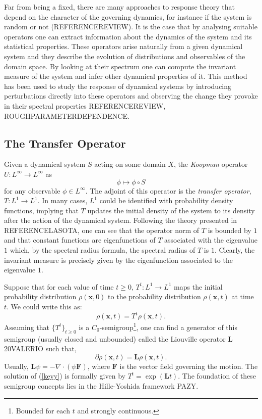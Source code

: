 Far from being a fixed, there are many approaches to response theory that depend on the character of the governing dynamics, for instance if the system is random or not (REFERENCEREVIEW). It is the case that by analysing suitable operators one can extract information about the dynamics of the system and its statistical properties. These operators arise naturally from a given dynamical system and they describe the evolution of distributions and observables of the domain space. By looking at their spectrum one can compute the invariant measure of the system and infer other dynamical properties of it. This method has been used to study the response of dynamical systems by introducing perturbations directly into these operators and observing the change they provoke in their spectral properties REFERENCEREVIEW, ROUGHPARAMETERDEPENDENCE.

\subsection*{The Transfer Operator}

Given a dynamical system $S$ acting on some domain $X$, the \emph{Koopman} operator $U:L^{\infty}\longrightarrow L^{\infty}$ as
\begin{equation}
	\phi \mapsto \phi \circ S
\end{equation}
for any observable $\phi \in L^{\infty}$. The adjoint of this operator is the \emph{transfer operator}, $T:L^1 \longrightarrow L^1$. In many cases, $L^1$ could be identified with probability density functions, implying that $T$ updates the initial density of the system to its density after the action of the dynamical system. Following the theory presented in REFERENCELASOTA, one can see that the operator norm of $T$ is bounded by $1$ and that constant functions are eigenfunctions of $T$ associated with the eigenvalue $1$ which, by the spectral radius formula, the spectral radius of $T$ is $1$. Clearly, the invariant measure is precisely given by the eigenfunction associated to the eigenvalue $1$.

Suppose that for each value of time $t\geq 0$, $T^t: L^1 \longrightarrow L^1$ maps the initial probability distribution $\rho(\mathbf{x},0)$ to the probability distribution $\rho(\mathbf{x},t)$ at time $t$. We could write this as:
\begin{equation}\label{keyy}
	\rho (\mathbf{x},t)= T^t\rho(\mathbf{x},t).
\end{equation}
Assuming that $\{T^t\}_{t\geq0}$ is a $C_0$-semigroup\footnote{Bounded for each $t$ and strongly continuous.}, one can find a generator of this semigroup (usually closed and unbounded) called the Liouville operator $\mathbf{L}$ 20VALERIO such that,
\begin{equation}
	\partial \rho (\mathbf{x},t)= \mathbf{L}\rho(\mathbf{x},t).
\end{equation}
Usually, $\mathbf{L}\psi=-\nabla \cdot (\psi \mathbf{F})$, where $\mathbf{F}$ is the vector field governing the motion. The solution of (\ref{keyy}) is formally given by $T^t=\exp (\mathbf{L}t)$. The foundation of these semigroup concepts lies in the Hille-Yoshida framework PAZY.

